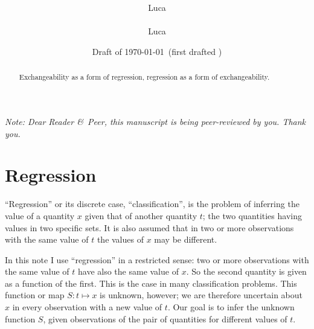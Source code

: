 \documentclass[\ifafour a4paper,12pt,\else a5paper,10pt,\fi%
onecolumn,oneside,article,%
british%
]{memoir}
\title{\propertitle%
}
\author{%
\ifpublic%
\hspace*{\stretch{1}}%
\parbox{0.5\linewidth}%
{\protect\centering Luca\\%
\footnotesize\epost{\email{piero.mana}{ntnu.no}}}%
\hspace*{\stretch{1}}%
\else%
Luca\\{\footnotesize\epost{\email{piero.mana}{ntnu.no}}%
}\fi%
}
\date{Draft of \today\ (first drafted \firstdraft)}
\theoremstyle{remark}
\theoremstyle{innote}
\newcommand*{\amp}{\&}
\newcommand*{\asudedication}[1]{%
{\par\centering\textit{#1}\par}}
\renewcommand*{\|}{\mathpunct{|}}
\begin{document}
\captiondelim{\quad}\captionnamefont{\footnotesize}\captiontitlefont{\footnotesize}
\frenchspacing

\maketitle
\ifpublic
\abstractrunin
\abslabeldelim{}
\renewcommand*{\abstractname}{}
\setlength{\absleftindent}{0pt}
\setlength{\absrightindent}{0pt}
\setlength{\abstitleskip}{-\absparindent}
\begin{abstract}%
  \noindent Exchangeability as a form of regression, regression as a form
  of exchangeability.
\end{abstract}\fi

\frenchspacing


\noindent\emph{\footnotesize Note: Dear Reader \amp\ Peer, this manuscript is
  being peer-reviewed by you. Thank you.}


\section{Regression}
\label{sec:regression}

\enquote{Regression} or its discrete case, \enquote{classification}, is the
problem of inferring the value of a quantity $x$ given that of another
quantity $t$; the two quantities having values in two specific sets. It is
also assumed that in two or more observations with the same value of $t$
the values of $x$ may be different.

In this note I use \enquote{regression} in a restricted sense: two or more
observations with the same value of $t$ have also the same value of $x$. So
the second quantity is given as a function of the first. This is the case
in many classification problems. This function or map $S\colon t \mapsto x$
is unknown, however; we are therefore uncertain about $x$ in every
observation with a new value of $t$. Our goal is to infer the unknown
function $S$, given observations of the pair of quantities for different
values of $t$.
\end{document}
